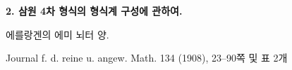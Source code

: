 
\begin{center}
{\Large\bfseries 2. 삼원 4차 형식의 형식계 구성에 관하여.}\par
\vspace{0.8em}
에를랑겐의 에미 뇌터 양.\par
\vspace{1.2em}
Journal f. d. reine u. angew. Math. 134 (1908), 23--90쪽 및 표 2개
\end{center}


